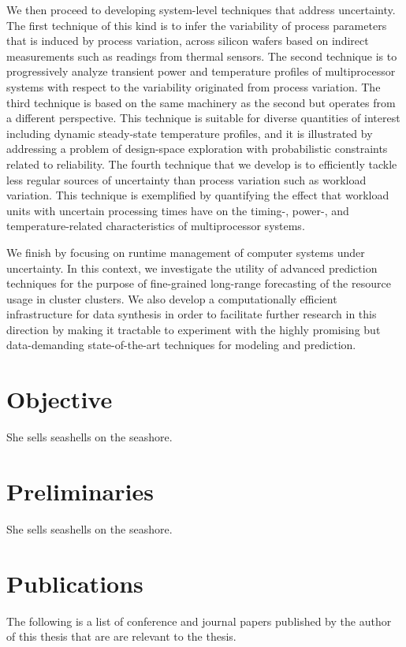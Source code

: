 We then proceed to developing system-level techniques that address uncertainty.
The first technique of this kind is to infer the variability of process
parameters that is induced by process variation, across silicon wafers based on
indirect measurements such as readings from thermal sensors. The second
technique is to progressively analyze transient power and temperature profiles
of multiprocessor systems with respect to the variability originated from
process variation. The third technique is based on the same machinery as the
second but operates from a different perspective. This technique is suitable for
diverse quantities of interest including dynamic steady-state temperature
profiles, and it is illustrated by addressing a problem of design-space
exploration with probabilistic constraints related to reliability. The fourth
technique that we develop is to efficiently tackle less regular sources of
uncertainty than process variation such as workload variation. This technique is
exemplified by quantifying the effect that workload units with uncertain
processing times have on the timing-, power-, and temperature-related
characteristics of multiprocessor systems.

We finish by focusing on runtime management of computer systems under
uncertainty. In this context, we investigate the utility of advanced prediction
techniques for the purpose of fine-grained long-range forecasting of the
resource usage in cluster clusters. We also develop a computationally efficient
infrastructure for data synthesis in order to facilitate further research in
this direction by making it tractable to experiment with the highly promising
but data-demanding state-of-the-art techniques for modeling and prediction.

\section{Objective}

She sells seashells on the seashore.

\section{Preliminaries}

She sells seashells on the seashore.

\section{Publications}

The following is a list of conference and journal papers published by the author
of this thesis that are are relevant to the thesis.

\printbibliography[heading=none,keyword=own]
